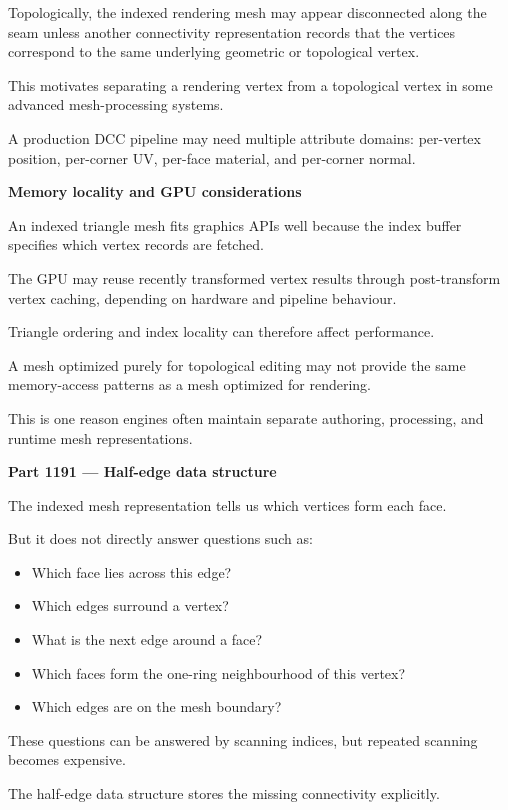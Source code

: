 Topologically, the indexed rendering mesh may appear disconnected along the seam unless another connectivity representation records that the vertices correspond to the same underlying geometric or topological vertex.

This motivates separating a rendering vertex from a topological vertex in some advanced mesh-processing systems.

A production DCC pipeline may need multiple attribute domains: per-vertex position, per-corner UV, per-face material, and per-corner normal.

\textbf{Memory locality and GPU considerations}

An indexed triangle mesh fits graphics APIs well because the index buffer specifies which vertex records are fetched.

The GPU may reuse recently transformed vertex results through post-transform vertex caching, depending on hardware and pipeline behaviour.

Triangle ordering and index locality can therefore affect performance.

A mesh optimized purely for topological editing may not provide the same memory-access patterns as a mesh optimized for rendering.

This is one reason engines often maintain separate authoring, processing, and runtime mesh representations.

\textbf{Part 1191 --- Half-edge data structure}

The indexed mesh representation tells us which vertices form each face.

But it does not directly answer questions such as:

\begin{itemize}
\tightlist
\item
  Which face lies across this edge?
\item
  Which edges surround a vertex?
\item
  What is the next edge around a face?
\item
  Which faces form the one-ring neighbourhood of this vertex?
\item
  Which edges are on the mesh boundary?
\end{itemize}

These questions can be answered by scanning indices, but repeated scanning becomes expensive.

The half-edge data structure stores the missing connectivity explicitly.

